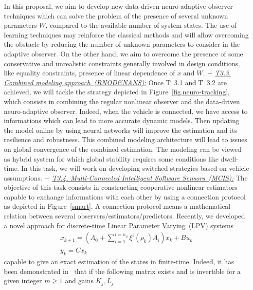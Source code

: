 \documentclass[a4paper,11pt]{article}
\begin{document}
\begin{itemize}[leftmargin=.2in,noitemsep,nolistsep]
In this proposal, we aim to develop new data-driven neuro-adaptive observer techniques which can solve the problem of the presence of several unknown parameters $W$, compared to the available number of system states. The use of learning techniques may reinforce the classical methods and will allow overcoming the obstacle by reducing the number of unknown parameters to consider in the adaptive observer. On the other hand, we aim to overcome the presence of some conservative and unrealistic constraints generally involved in design conditions, like equality constraints, presence of linear dependence of $x$ and $W$.
%
\subitem$-$  \underline{\it T3.3. Combined modeling approach~(RNOD\&NANS):} Once T~3.1 and T~3.2 are achieved, we will tackle the strategy depicted in Figure~\ref{fig.neuro-tracking}, which consists in combining the regular nonlinear observer and the data-driven neuro-adaptive observer. Indeed, when the vehicle is connected, we have access to informations which can lead to more accurate dynamic models. Then updating the model online by using neural networks will improve the estimation and its resilience and robustness. This combined modeling architecture will lead to issues on global convergence of the combined estimation. The modeling can be viewed as hybrid system for which global stability requires some conditions like dwell-time. In this task, we will work on developing switched strategies based on vehicle assumptions.
%
\subitem$-$  \underline{\it T3.4. Multi-Connected Intelligent Software Sensors~(MCIS):}
The objective of this task consists in constructing cooperative nonlinear estimators capable to exchange informations with each other by using a connection protocol as depicted in Figure~\ref{smart}. A connection protocol means a mathematical relation between several observers/estimators/predictors. Recently, we developed a novel approach for discrete-time Linear Parameter Varying~(LPV) systems 
{
\scriptsize
\begin{subequations}\label{s2.e1}
  \begin{gather}
    x_{k+1} = \left( A_0 + \sum^{i=n_\rho}_{i=1}\xi^{i}(\rho_{k})A_i \right)x_{k}+Bu_{k}\label{s2.e1.1}\\
    y_{k} = Cx_{k}\label{s2.e1.2}
  \end{gather}
\end{subequations}
}
capable to give an exact estimation of the states in finite-time. Indeed, it has been demonstrated in~\cite{chaib2019state} that if the following matrix exists and is invertible for a given integer $m \geq 1$ and gains $K_j, L_j$

\end{itemize}
\end{document}
